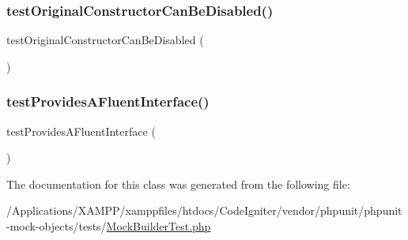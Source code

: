 \subsubsection{\texorpdfstring{test\+Original\+Constructor\+Can\+Be\+Disabled()}{testOriginalConstructorCanBeDisabled()}}
{\footnotesize\ttfamily test\+Original\+Constructor\+Can\+Be\+Disabled (\begin{DoxyParamCaption}{ }\end{DoxyParamCaption})}

\mbox{\label{class_framework___mock_builder_test_a957aa3cf80b1f0e0e5b1d758a605d37f}} 
\subsubsection{\texorpdfstring{test\+Provides\+A\+Fluent\+Interface()}{testProvidesAFluentInterface()}}
{\footnotesize\ttfamily test\+Provides\+A\+Fluent\+Interface (\begin{DoxyParamCaption}{ }\end{DoxyParamCaption})}



The documentation for this class was generated from the following file\+:\begin{DoxyCompactItemize}
\item 
/\+Applications/\+X\+A\+M\+P\+P/xamppfiles/htdocs/\+Code\+Igniter/vendor/phpunit/phpunit-\/mock-\/objects/tests/\mbox{\hyperlink{_mock_builder_test_8php}{Mock\+Builder\+Test.\+php}}\end{DoxyCompactItemize}
